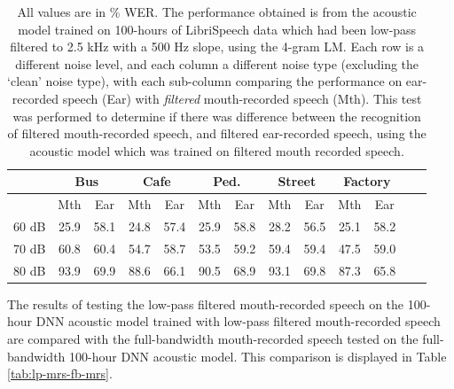 \begin{table}[h]
\begin{center}
\begin{tabular}{| c || c | c | c | c | c | c | c | c | c | c | c | c |} \hline
      & \multicolumn{2}{|c|}{Bus} & \multicolumn{2}{|c|}{Cafe} & \multicolumn{2}{|c|}{Ped.} & \multicolumn{2}{|c|}{Street} & \multicolumn{2}{|c|}{Factory} \\ \hline
      & Mth & Ear & Mth & Ear & Mth & Ear & Mth & Ear & Mth & Ear \\ \hline\hline
60 dB & 25.9 & 58.1 & 24.8 & 57.4 & 25.9 & 58.8 & 28.2 & 56.5 & 25.1 & 58.2  \\ \hline
70 dB & 60.8 & 60.4 & 54.7 & 58.7 & 53.5 & 59.2 & 59.4 & 59.4 & 47.5 & 59.0  \\ \hline
80 dB & 93.9 & 69.9 & 88.6 & 66.1 & 90.5 & 68.9 & 93.1 & 69.8 & 87.3 & 65.8  \\ \hline
\end{tabular}
\end{center}
\caption{All values are in \% WER. The performance obtained is from the acoustic model trained on 100-hours of LibriSpeech data which had been low-pass filtered to 2.5 kHz with a 500 Hz slope, using the 4-gram LM. Each row is a different noise level, and each column a different noise type (excluding the `clean' noise type), with each sub-column comparing the performance on ear-recorded speech (Ear) with \textit{filtered} mouth-recorded speech (Mth). This test was performed to determine if there was difference between the recognition of filtered mouth-recorded speech, and filtered ear-recorded speech, using the acoustic model which was trained on filtered mouth recorded speech.}\label{tab:lp-ers-mrs}
\end{table}

The results of testing the low-pass filtered mouth-recorded speech on the 100-hour DNN acoustic model trained with low-pass filtered mouth-recorded speech are compared with the full-bandwidth mouth-recorded speech tested on the full-bandwidth 100-hour DNN acoustic model.  This comparison is displayed in Table \ref{tab:lp-mrs-fb-mrs}.

